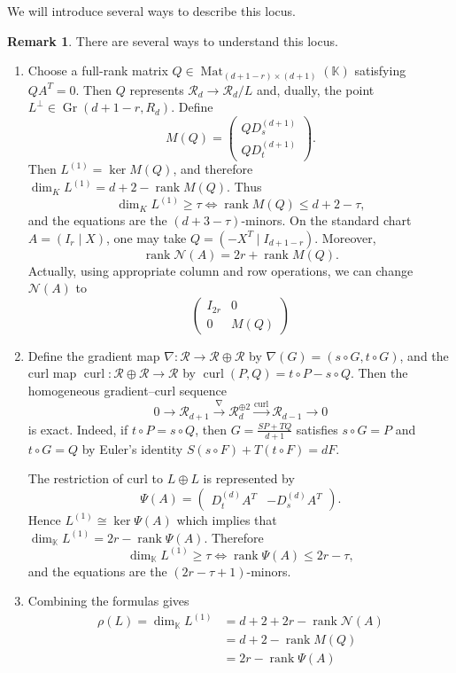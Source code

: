 \documentclass[a4paper, 11pt]{amsart}
\numberwithin{theorem}{section}
\theoremstyle{definition}
\newtheorem{remark}[theorem]{Remark}
\numberwithin{equation}{section}
\newcommand{\cR}{\mathcal R}
\newcommand{\Gr}{\operatorname{Gr}}
\newcommand{\rank}{\operatorname{rank}}
\newcommand{\curl}{\operatorname{curl}}
\begin{document}
We will introduce several ways to describe this locus.
\begin{remark}
There are several ways to understand this locus.
\begin{enumerate}
\item Choose a full-rank matrix $Q\in\operatorname{Mat}_{(d+1-r)\times(d+1)}(\mathbb{K})$ satisfying $QA^T=0$.
Then $Q$ represents $\cR_d\to\cR_d/L$ and, dually, the point $L^\perp\in\Gr(d+1-r,R_d)$. 
Define
\[
M(Q)=
\begin{pmatrix}
QD_s^{(d+1)}\\
QD_t^{(d+1)}
\end{pmatrix}.
\]
Then $L^{(1)}=\ker M(Q)$, and therefore $\dim_K L^{(1)}=d+2-\rank M(Q)$.
Thus
\[
\dim_KL^{(1)}\ge\tau \iff \rank M(Q)\le d+2-\tau,
\]
and the equations are the $(d+3-\tau)$-minors. 
On the standard chart $A=(I_r\mid X)$, one may take $Q=(-X^T\mid I_{d+1-r})$.
Moreover,
\[
\rank \mathcal{N}(A) = 2r + \rank M(Q).
\]
Actually, using appropriate column and row operations, we can change $\mathcal{N}(A)$ to
\[\begin{pmatrix} I_{2r}&0\\0&M(Q)\end{pmatrix}\]

\item Define the gradient map $\nabla: \mathcal{R} \to \mathcal{R}\oplus \mathcal{R}$ by $\nabla(G) = (s \circ G, t \circ G)$, and the curl map $\curl: \mathcal{R}\oplus\mathcal{R} \to \mathcal{R}$ by $\curl(P,Q) = t \circ P - s \circ Q$.
Then the homogeneous gradient--curl sequence
\[
0\longrightarrow\cR_{d+1}
\xrightarrow{\nabla}\cR_d^{\oplus2}
\xrightarrow{\curl}\cR_{d-1}
\longrightarrow0
\]
is exact.
Indeed, if $t\circ P=s\circ Q$, then $G=\frac{SP+TQ}{d+1}$ satisfies $s\circ G=P$ and $t\circ G=Q$ by Euler's identity $S(s\circ F)+T(t\circ F)=dF$.

The restriction of curl to $L\oplus L$ is represented by
\[
\Psi(A)=
\begin{pmatrix}
D_t^{(d)}A^T&-D_s^{(d)}A^T
\end{pmatrix}.
\]
Hence $L^{(1)} \cong \ker \Psi(A)$ which implies that $\dim_{\mathbb{K}} L^{(1)} = 2r - \rank \Psi(A)$.
Therefore
\[
\dim_{\mathbb{K}}L^{(1)} \geq \tau \iff \rank\Psi(A) \leq 2r - \tau,
\]
and the equations are the $(2r- \tau + 1)$-minors. 


\item Combining the formulas gives
\[
\begin{aligned}
\rho(L)=\dim_\mathbb{K}L^{(1)}
&=d+2+2r-\rank\mathcal N(A)\\
&=d+2-\rank M(Q)\\
&=2r-\rank\Psi(A)\\
\end{aligned}
\]
\end{enumerate}
\end{remark}
\end{document}
